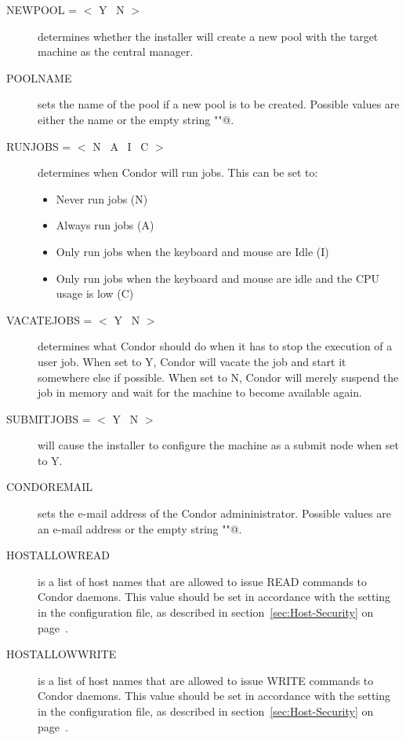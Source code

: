 \begin{description}
\item [NEWPOOL = $<$ Y \Bar\ N $>$]
determines whether the installer will create a new pool with the target
machine as the central manager.

\item [POOLNAME]
sets the name of the pool if a new pool is to be created. Possible values
are either the name or the empty string \verb@""@.

\item [RUNJOBS = $<$ N \Bar\ A \Bar\ I \Bar\ C $>$]
determines when Condor will run jobs. This can be set to:
\begin{itemize}
\item Never run jobs (N)
\item Always run jobs (A)
\item Only run jobs when the keyboard and mouse are Idle (I)
\item Only run jobs when the keyboard and mouse are idle and the CPU
usage is low (C)
\end{itemize}

\item [VACATEJOBS = $<$ Y \Bar\ N $>$]
determines what Condor should do when it has to stop the execution of
a user job. When set to Y, Condor will vacate the job and start
it somewhere else if possible. When set to N, Condor will merely
suspend the job in memory and wait for the machine to become available
again. 

\item[SUBMITJOBS  = $<$ Y \Bar\ N $>$]
will cause the installer to configure the machine as a submit
node when set to Y. 

\item[CONDOREMAIL]
sets the e-mail address of the Condor admininistrator. Possible values are
an e-mail address or the empty string \verb@""@.

\item[HOSTALLOWREAD]
is a list of host names that are allowed to issue READ commands to
Condor daemons. This value should be set in accordance with the
 setting in the configuration file, as described in
section~\ref{sec:Host-Security} on page~\pageref{sec:Host-Security}.

\item[HOSTALLOWWRITE]
is a list of host names that are allowed to issue WRITE commands to
Condor daemons. This value should be set in accordance with the
 setting in the configuration file, as described in
section~\ref{sec:Host-Security} on page~\pageref{sec:Host-Security}.


\end{description}
